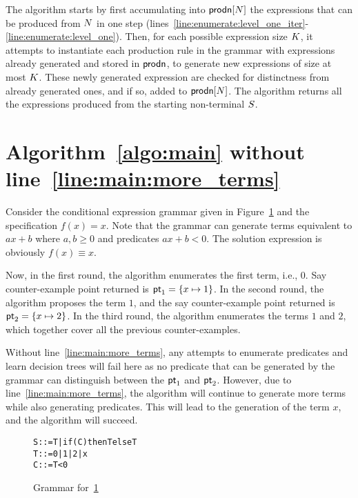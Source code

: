 \begin{appendices}
The algorithm starts by first accumulating into
$\mathsf{prodn}[N]$ the expressions that can be produced from
$N$ in one step
(lines~\ref{line:enumerate:level_one_iter}-\ref{line:enumerate:level_one}).
Then, for each possible expression size $K$, it attempts to
instantiate each production rule in the grammar with expressions already
generated and stored in $\mathsf{prodn}$, to generate new expressions of
size at most $K$.
These newly generated expression are checked for distinctness from
already generated ones, and if so, added to
$\mathsf{prodn}[N]$.
The algorithm returns all the expressions produced from the starting
non-terminal $S$.

\section{Algorithm~\ref{algo:main} without line~\ref{line:main:more_terms}}
\label{sec:app:ex}

Consider the conditional expression grammar given in
Figure~\ref{fig:bad_grammar} and the specification $f(x) = x$.
Note that the grammar can generate terms equivalent to $ax + b$ where
$a, b \geq 0$ and predicates $ax + b < 0$.
The solution expression is obviously $f(x) \equiv x$.


Now, in the first round, the algorithm enumerates the first term, i.e.,
$0$.
Say counter-example point returned is $\mathsf{pt}_1 = \{ x \mapsto 1 \}$.
In the second round, the algorithm proposes the term $1$, and the
say counter-example point returned is $\mathsf{pt}_2 = \{ x \mapsto 2 \}$.
In the third round, the algorithm enumerates the terms $1$ and $2$,
which together cover all the previous counter-examples.

Without line~\ref{line:main:more_terms}, any attempts to enumerate
predicates and learn decision trees will fail here as no predicate that
can be generated by the grammar can distinguish between the $\mathsf{pt}_1$
and $\mathsf{pt}_2$.
However, due to line~\ref{line:main:more_terms}, the algorithm will
continue to generate more terms while also generating predicates.
This will lead to the generation of the term $x$, and the algorithm will
succeed.

\begin{figure}[!t]
\vspace*{3ex}
  \begin{alltt}
  \fontsize{9}{10}\selectfont
                      S ::= T | if (C) then T else T
                      T ::= 0 | 1 | 2 | x
                      C ::= T < 0
\end{alltt}
\caption{Grammar for~\ref{sec:app:ex}}
  \label{fig:bad_grammar}
\end{figure}


\end{appendices}
